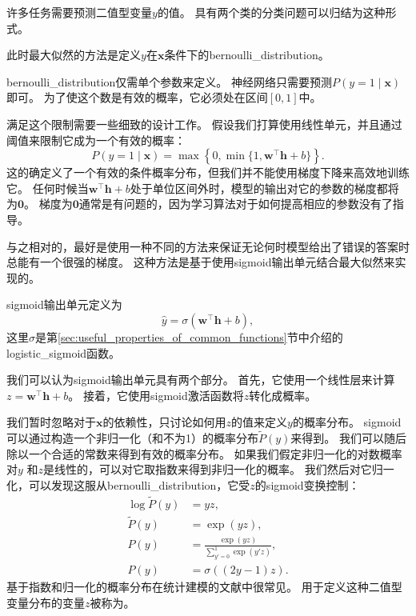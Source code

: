 许多任务需要预测二值型变量$y$的值。
具有两个类的分类问题可以归结为这种形式。

此时最大似然的方法是定义$y$在$\bm{x}$条件下的\gls{bernoulli_distribution}。

\gls{bernoulli_distribution}仅需单个参数来定义。
神经网络只需要预测$P(y =1\mid\bm{x})$即可。
为了使这个数是有效的概率，它必须处在区间$[0, 1]$中。

满足这个限制需要一些细致的设计工作。
假设我们打算使用线性单元，并且通过阈值来限制它成为一个有效的概率：
\begin{equation}
P(y=1 \mid \bm{x}) = \max \left \{ 0, \min \{1, \bm{w}^\top \bm{h}+b \} \right \}.
\end{equation}
这的确定义了一个有效的条件概率分布，但我们并不能使用梯度下降来高效地训练它。
任何时候当$\bm{w}^\top \bm{h}+b$处于单位区间外时，模型的输出对它的参数的梯度都将为$\bm{0}$。
梯度为$\bm{0}$通常是有问题的，因为学习算法对于如何提高相应的参数没有了指导。


与之相对的，最好是使用一种不同的方法来保证无论何时模型给出了错误的答案时总能有一个很强的梯度。
这种方法是基于使用\gls{sigmoid}输出单元结合最大似然来实现的。

\gls{sigmoid}输出单元定义为
\begin{equation}
\hat{y} = \sigma \left (\bm{w}^\top \bm{h} + b \right ),
\end{equation}
这里$\sigma$是第\ref{sec:useful_properties_of_common_functions}节中介绍的\gls{logistic_sigmoid}函数。

我们可以认为\gls{sigmoid}输出单元具有两个部分。
首先，它使用一个线性层来计算$z=\bm{w}^\top \bm{h}+b$。
接着，它使用\gls{sigmoid}激活函数将$z$转化成概率。

我们暂时忽略对于$\bm{x}$的依赖性，只讨论如何用$z$的值来定义$y$的概率分布。
\gls{sigmoid}可以通过构造一个非归一化（和不为1）的概率分布$\tilde{P}(y)$来得到。
我们可以随后除以一个合适的常数来得到有效的概率分布。
如果我们假定非归一化的对数概率对$y$ 和$z$是线性的，可以对它取指数来得到非归一化的概率。
我们然后对它归一化，可以发现这服从\gls{bernoulli_distribution}，它受$z$的\gls{sigmoid}变换控制：
\begin{align}
\log \tilde{P}(y) &= yz,\\
\tilde{P}(y) &= \exp(yz),\\
P(y) &= \frac{\exp(yz)}{\sum_{y' = 0}^1 \exp(y' z)},\\
P(y) &= \sigma((2y-1)z).
\end{align}
基于指数和归一化的概率分布在统计建模的文献中很常见。
用于定义这种二值型变量分布的变量$z$被称为。

